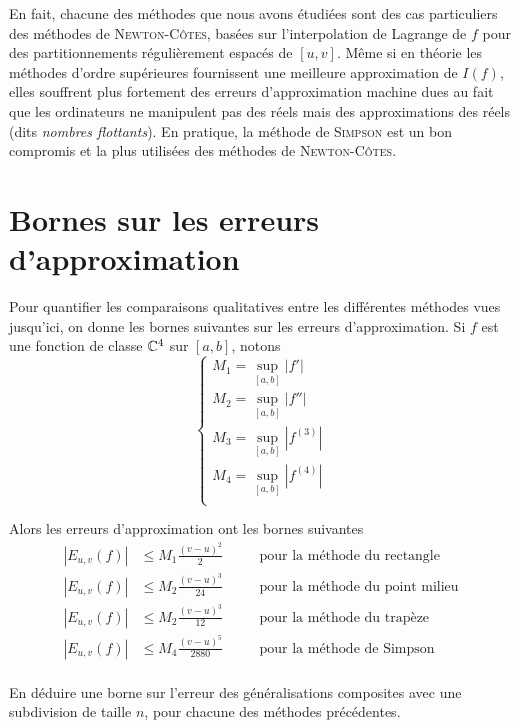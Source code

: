 En fait, chacune des méthodes que nous avons étudiées sont des cas particuliers des méthodes de \textsc{Newton-Côtes}, basées sur l'interpolation de Lagrange de $ f $ pour des partitionnements régulièrement espacés de $ [u, v] $. Même si en théorie les méthodes d'ordre supérieures fournissent une meilleure approximation de $ I(f) $, elles souffrent plus fortement des erreurs d'approximation machine dues au fait que les ordinateurs ne manipulent pas des réels mais des approximations des réels (dits \textit{nombres flottants}). En pratique, la méthode de \textsc{Simpson} est un bon compromis et la plus utilisées des méthodes de \textsc{Newton-Côtes}.

\section{Bornes sur les erreurs d'approximation}

Pour quantifier les comparaisons qualitatives entre les différentes méthodes vues jusqu'ici, on donne les bornes suivantes sur les erreurs d'approximation.
Si $ f $ est une fonction de classe $ \mathbb{C}^4 $ sur $ [a, b] $, notons \[
    \begin{cases}
        M_1 = \sup_{[a, b]} |f'|\\
        M_2 = \sup_{[a, b]} |f''|\\
        M_3 = \sup_{[a, b]} |f^{(3)}|\\
        M_4 = \sup_{[a, b]} |f^{(4)}|\\
    \end{cases}
\]

Alors les erreurs d'approximation ont les bornes suivantes 
\begin{align*}
    |E_{u,v}(f)| &\leq M_1 \frac{(v-u)^2}{2} \quad &&\textrm{pour la méthode du rectangle}\\
    |E_{u,v}(f)| &\leq M_2 \frac{(v-u)^3}{24} \quad &&\textrm{pour la méthode du point milieu}\\
    |E_{u,v}(f)| &\leq M_2 \frac{(v-u)^3}{12} \quad &&\textrm{pour la méthode du trapèze}\\
    |E_{u,v}(f)| &\leq M_4 \frac{(v-u)^5}{2880} \quad &&\textrm{pour la méthode de Simpson}\\
\end{align*}


\ques En déduire une borne sur l'erreur des généralisations composites avec une subdivision de taille $ n $, pour chacune des méthodes précédentes.
